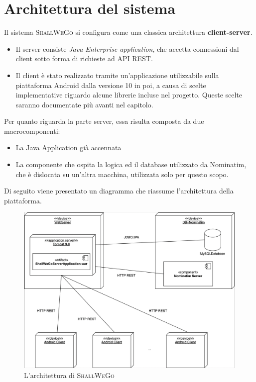     \newpage

\section{Architettura del sistema}
    Il sistema \textsc{ShallWeGo} si configura come una classica architettura \textbf{client-server}.
    \begin{itemize}
        \item Il server consiste \textit{Java Enterprise application}, che accetta connessioni dal client sotto forma di richieste ad API REST.
        \item Il client è stato realizzato tramite un'applicazione utilizzabile sulla piattaforma Android dalla versione 10 in poi, a causa di scelte implementative riguardo alcune librerie incluse nel progetto. Queste scelte saranno documentate più avanti nel capitolo.
    \end{itemize}

    Per quanto riguarda la parte server, essa risulta composta da due macrocomponenti:

    \begin{itemize}
        \item La Java Application già accennata
        \item La componente che ospita la logica ed il database utilizzato da Nominatim, che è dislocata su un'altra macchina, utilizzata solo per questo scopo.
    \end{itemize}

    Di seguito viene presentato un diagramma che riassume l'architettura della piattaforma.

    \begin{figure}[H]
        \includegraphics[width=\columnwidth]{capitolo4/figure/Deployment Diagram.png}
        \caption{L'architettura di \textsc{ShallWeGo}}
        \label{L'architettura di ShallWeGo}
    \end{figure}

